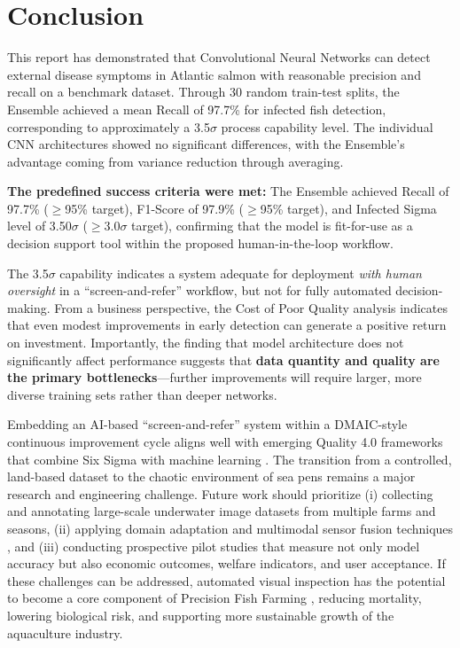 \documentclass[12pt,a4paper]{article}
\begin{document}
\section{Conclusion}

This report has demonstrated that Convolutional Neural Networks can detect external disease symptoms in Atlantic salmon with reasonable precision and recall on a benchmark dataset. Through 30 random train-test splits, the Ensemble achieved a mean Recall of 97.7\% for infected fish detection, corresponding to approximately a 3.5$\sigma$ process capability level. The individual CNN architectures showed no significant differences, with the Ensemble's advantage coming from variance reduction through averaging.

\textbf{The predefined success criteria were met:} The Ensemble achieved Recall of 97.7\% ($\ge$95\% target), F1-Score of 97.9\% ($\ge$95\% target), and Infected Sigma level of 3.50$\sigma$ ($\ge$3.0$\sigma$ target), confirming that the model is fit-for-use as a decision support tool within the proposed human-in-the-loop workflow.

The 3.5$\sigma$ capability indicates a system adequate for deployment \emph{with human oversight} in a ``screen-and-refer'' workflow, but not for fully automated decision-making. From a business perspective, the Cost of Poor Quality analysis indicates that even modest improvements in early detection can generate a positive return on investment. Importantly, the finding that model architecture does not significantly affect performance suggests that \textbf{data quantity and quality are the primary bottlenecks}---further improvements will require larger, more diverse training sets rather than deeper networks.

Embedding an AI-based ``screen-and-refer'' system within a DMAIC-style continuous improvement cycle aligns well with emerging Quality 4.0 frameworks that combine Six Sigma with machine learning \citep{10.1108/TQM-11-2023-0361}. The transition from a controlled, land-based dataset to the chaotic environment of sea pens remains a major research and engineering challenge. Future work should prioritize (i) collecting and annotating large-scale underwater image datasets from multiple farms and seasons, (ii) applying domain adaptation and multimodal sensor fusion techniques \citep{karthika2024deep, 10048777}, and (iii) conducting prospective pilot studies that measure not only model accuracy but also economic outcomes, welfare indicators, and user acceptance. If these challenges can be addressed, automated visual inspection has the potential to become a core component of Precision Fish Farming \citep{FORE2018176}, reducing mortality, lowering biological risk, and supporting more sustainable growth of the aquaculture industry.
\end{document}
